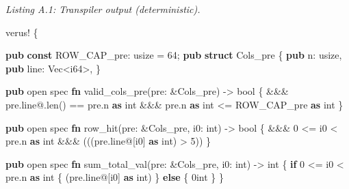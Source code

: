 \documentclass[
]{article}
\newenvironment{Shaded}{}{}
\newcommand{\ControlFlowTok}[1]{\textcolor[rgb]{0.00,0.44,0.13}{\textbf{#1}}}
\newcommand{\DataTypeTok}[1]{\textcolor[rgb]{0.56,0.13,0.00}{#1}}
\newcommand{\DecValTok}[1]{\textcolor[rgb]{0.25,0.63,0.44}{#1}}
\newcommand{\KeywordTok}[1]{\textcolor[rgb]{0.00,0.44,0.13}{\textbf{#1}}}
\newcommand{\NormalTok}[1]{#1}
\newcommand{\OperatorTok}[1]{\textcolor[rgb]{0.40,0.40,0.40}{#1}}
\newcommand{\PreprocessorTok}[1]{\textcolor[rgb]{0.74,0.48,0.00}{#1}}
\begin{document}
\emph{Listing A.1: Transpiler output (deterministic).}

\begin{Shaded}
\begin{Highlighting}[]
\PreprocessorTok{verus!} \OperatorTok{\{}

\KeywordTok{pub} \KeywordTok{const}\NormalTok{ ROW\_CAP\_pre}\OperatorTok{:} \DataTypeTok{usize} \OperatorTok{=} \DecValTok{64}\OperatorTok{;}
\KeywordTok{pub} \KeywordTok{struct}\NormalTok{ Cols\_pre }\OperatorTok{\{}
    \KeywordTok{pub}\NormalTok{ n}\OperatorTok{:} \DataTypeTok{usize}\OperatorTok{,}
    \KeywordTok{pub}\NormalTok{ line}\OperatorTok{:} \DataTypeTok{Vec}\OperatorTok{\textless{}}\DataTypeTok{i64}\OperatorTok{\textgreater{},}
\OperatorTok{\}}

\KeywordTok{pub}\NormalTok{ open spec }\KeywordTok{fn}\NormalTok{ valid\_cols\_pre(pre}\OperatorTok{:} \OperatorTok{\&}\NormalTok{Cols\_pre) }\OperatorTok{{-}\textgreater{}} \DataTypeTok{bool} \OperatorTok{\{}
    \OperatorTok{\&\&\&}\NormalTok{ pre}\OperatorTok{.}\NormalTok{line}\OperatorTok{@.}\NormalTok{len() }\OperatorTok{==}\NormalTok{ pre}\OperatorTok{.}\NormalTok{n }\KeywordTok{as}\NormalTok{ int}
    \OperatorTok{\&\&\&}\NormalTok{ pre}\OperatorTok{.}\NormalTok{n }\KeywordTok{as}\NormalTok{ int }\OperatorTok{\textless{}=}\NormalTok{ ROW\_CAP\_pre }\KeywordTok{as}\NormalTok{ int}
\OperatorTok{\}}

\KeywordTok{pub}\NormalTok{ open spec }\KeywordTok{fn}\NormalTok{ row\_hit(pre}\OperatorTok{:} \OperatorTok{\&}\NormalTok{Cols\_pre}\OperatorTok{,}\NormalTok{ i0}\OperatorTok{:}\NormalTok{ int) }\OperatorTok{{-}\textgreater{}} \DataTypeTok{bool} \OperatorTok{\{}
    \OperatorTok{\&\&\&} \DecValTok{0} \OperatorTok{\textless{}=}\NormalTok{ i0 }\OperatorTok{\textless{}}\NormalTok{ pre}\OperatorTok{.}\NormalTok{n }\KeywordTok{as}\NormalTok{ int}
    \OperatorTok{\&\&\&}\NormalTok{ (((pre}\OperatorTok{.}\NormalTok{line}\OperatorTok{@}\NormalTok{[i0] }\KeywordTok{as}\NormalTok{ int) }\OperatorTok{\textgreater{}} \DecValTok{5}\NormalTok{))}
\OperatorTok{\}}

\KeywordTok{pub}\NormalTok{ open spec }\KeywordTok{fn}\NormalTok{ sum\_total\_val(pre}\OperatorTok{:} \OperatorTok{\&}\NormalTok{Cols\_pre}\OperatorTok{,}\NormalTok{ i0}\OperatorTok{:}\NormalTok{ int) }\OperatorTok{{-}\textgreater{}}\NormalTok{ int }\OperatorTok{\{}
    \ControlFlowTok{if} \DecValTok{0} \OperatorTok{\textless{}=}\NormalTok{ i0 }\OperatorTok{\textless{}}\NormalTok{ pre}\OperatorTok{.}\NormalTok{n }\KeywordTok{as}\NormalTok{ int }\OperatorTok{\{}
\NormalTok{        (pre}\OperatorTok{.}\NormalTok{line}\OperatorTok{@}\NormalTok{[i0] }\KeywordTok{as}\NormalTok{ int)}
    \OperatorTok{\}} \ControlFlowTok{else} \OperatorTok{\{}
\NormalTok{        0int}
    \OperatorTok{\}}
\OperatorTok{\}}


\end{Highlighting}
\end{Shaded}
\end{document}

